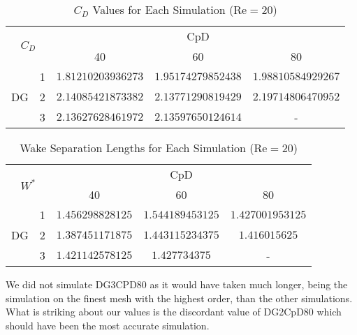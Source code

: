 \begin{table}[htp]
	\centering
	\def\arraystretch{1.5}
			\begin{tabular}{|c|c|c|c|c|}
				\hline
				\multicolumn{2}{|c|}{\multirow{2}{*}{$C_D$}} & \multicolumn{3}{c|}{CpD} \\ \cline{3-5} 
				\multicolumn{2}{|c|}{}                       & 40     & 60    & 80    \\ \hline
				\multirow{3}{*}{DG}            & 1           &    $1.81210203936273$    &  $1.95174279852438$     &    $1.98810584929267$    \\ \cline{2-5} 
				& 2           &    $2.14085421873382$    &    $2.13771290819429$   &   $2.19714806470952$     \\ \cline{2-5} 
				& 3           &    $2.13627628461972$    &     $2.13597650124614$  &   -     \\ \hline
			\end{tabular}
			\caption[$C_D$ Values for each simulation]{$C_D$ Values for Each Simulation ($\text{Re} = 20$)}	
			\label{C_D20}
		\end{table}
			\begin{table}[htp]
		\centering
		\def\arraystretch{1.5}
		\begin{tabular}{|c|c|c|c|c|}
			\hline
			\multicolumn{2}{|c|}{\multirow{2}{*}{$W^*$}} & \multicolumn{3}{c|}{CpD} \\ \cline{3-5} 
			\multicolumn{2}{|c|}{}                       & 40     & 60    & 80    \\ \hline
			\multirow{3}{*}{DG}            & 1           &    $1.456298828125$    &     $1.544189453125$  &    $1.427001953125$    \\ \cline{2-5} 
			& 2           &    $1.387451171875$    &     $1.443115234375$  &    $1.416015625$    \\ \cline{2-5} 
			& 3           &     $1.421142578125$   &     $1.427734375$  &    -    \\ \hline
		\end{tabular}
		\caption{Wake Separation Lengths for Each Simulation ($\text{Re} = 20$)}	
		\label{W20}
\end{table}
We did not simulate DG3CPD80 as it would have taken much longer, being the simulation on the finest mesh with the highest order, than the other simulations. What is striking about our values is the discordant value of DG2CpD80 which should have been the most accurate simulation. 

